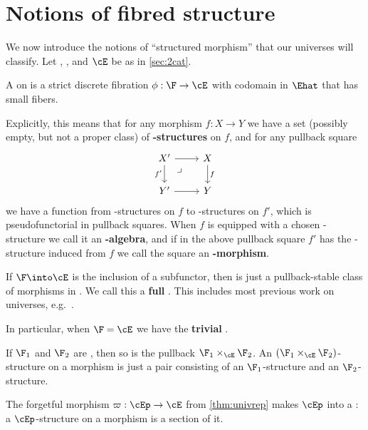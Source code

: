 \section{Notions of fibred structure}
\label{sec:nfs}

We now introduce the notions of ``structured morphism'' that our universes will classify.
Let \E, \Ehat, and $\cE$ be as in \cref{sec:2cat}.

\begin{defn}\label{defn:fcos}
  A \textbf{\nfs} on \E is a strict discrete fibration $\phi:\F\to\cE$ with codomain \cE in $\Ehat$ that has small fibers.
\end{defn}

Explicitly, this means that for any morphism $f:X\to Y$ we have a set (possibly empty, but not a proper class) of \textbf{\F-structures} on $f$, and for any pullback square
\[
  \begin{tikzcd}
    X' \ar[d,"f'"'] \ar[r] \ar[dr,phantom, near start,"\lrcorner"] & X \ar[d,"f"]\\
    Y' \ar[r] & Y
  \end{tikzcd}
\]
we have a function from \F-structures on $f$ to \F-structures on $f'$, which is pseudofunctorial in pullback squares.
When $f$ is equipped with a chosen \F-structure we call it an \textbf{\F-algebra}, and if in the above pullback square $f'$ has the \F-structure induced from $f$ we call the square an \textbf{\F-morphism}.

\begin{eg}\label{eg:full-fcos}
  If $\F\into\cE$ is the inclusion of a subfunctor, then \F is just a pullback-stable class of morphisms in \E.
  We call this a \textbf{full} \nfs.
  This includes most previous work on universes, e.g.~\cite{klv:ssetmodel,shulman:elreedy,cisinski:elegant,stenzel:thesis}.

  In particular, when $\F=\cE$ we have the \textbf{trivial} \nfs.
\end{eg}

\begin{eg}\label{eg:pb-fcos}
  If $\F_1$ and $\F_2$ are \nfss, then so is the pullback $\F_1\times_\cE \F_2$.
  An $(\F_1\times_\cE \F_2)$-structure on a morphism is just a pair consisting of an $\F_1$-structure and an $\F_2$-structure.
\end{eg}

\begin{eg}\label{eg:retr-fcos}
  The forgetful morphism $\varpi:\cEp \to \cE$ from \cref{thm:univrep} makes $\cEp$ into a \nfs: a $\cEp$-structure on a morphism is a section of it.
\end{eg}

